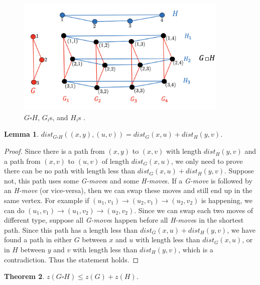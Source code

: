 \documentclass[1p]{elsarticle}
\newtheorem{theorem}{Theorem}
\newtheorem{lemma}[theorem]{Lemma}
\begin{document}
\begin{figure}[h!]
	
	\centering
	\includegraphics[width=0.9\textwidth]{fig/cp3.png}
	\caption{$G \square H$, $G_i$s, and $H_i$s .}
	\label{fig:p1}
\end{figure}



\begin{lemma} \label{shortestpathlemma}
	$dist_{G \square H}((x,y),(u,v)) = dist_G(x,u) + dist_H(y,v)$.
\end{lemma}
\begin{proof}
	Since there is a path from $(x,y)$ to $(x,v)$ with length $dist_H(y,v)$ and a path from $(x,v)$ to $(u,v)$ of length
	$dist_G(x,u)$, we only need to prove there can be no path with length less than $dist_G(x,u) + dist_H(y,v)$.
	Suppose not, this path uses some {\it G-move}s and some {\it H-move}s. If a {\it G-move} is followed by an {\it
	H-move} (or vice-versa), then we can swap these moves and still end up in the same vertex. For example if $(u_1,v_1)
	\rightarrow (u_2,v_1) \rightarrow (u_2,v_2)$ is happening, we can do $(u_1,v_1) \rightarrow (u_1,v_2) \rightarrow
	(u_2,v_2)$. Since we can swap each two moves of different type, suppose all {\it G-move}s happen before all {\it
	H-move}s in the shortest path. Since this path has a length less than $dist_G(x,u) + dist_H(y,v)$, we have found a
	path in either $G$ between $x$ and $u$ with length less than $dist_G(x,u)$, or in $H$ between $y$ and $v$ with
	length less than $dist_H(y,v)$, which is a contradiction. Thus the statement holds.
\end{proof}




\begin{theorem}
	$z(G \square H) \leq z(G) + z(H)$.
\end{theorem}
\end{document}
